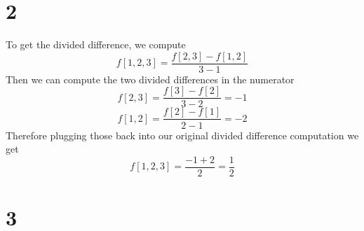 \documentclass{article}
\begin{document}
\section*{2}
To get the divided difference, we compute 
\[f[1,2,3] = \frac{f[2,3]-f[1,2]}{3-1} \]
Then we can compute the two divided differences in the numerator 
\[f[2,3] = \frac{f[3]-f[2]}{3-2} = -1 \]
\[f[1,2] = \frac{f[2]-f[1]}{2-1} = -2 \]
Therefore plugging those back into our original divided difference computation we get 
\[ f[1,2,3] = \frac{-1 + 2}{2} = \frac{1}{2} \]

\section*{3}
\end{document}
